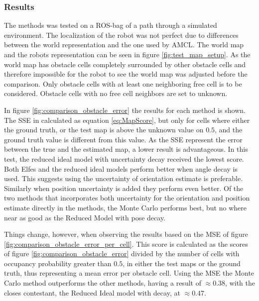 \subsubsection{Results}
The methods was tested on a ROS-bag of a path through a simulated environment. 
The localization of the robot was not perfect due to differences between the world representation and the one used by AMCL.
The world map and the robots representation can be seen in figure \vref{fig:test_map_setup}.
As the world map has obstacle cells completely surrounded by other obstacle cells and therefore impossible for the robot to see the world map was adjusted before the comparison. Only obstacle cells with at least one neighboring free cell is to be considered. Obstacle cells with no free cell neighbors are set to unknown. 

In figure \vref{fig:comparison_obstacle_error} the results for each method is shown. The SSE in calculated as equation \vref{eq:MapScore}, but only for cells where either the ground truth, or the test map is above the unknown value on $0.5$, and the ground truth value is different from this value. As the SSE represent the error between the true and the estimated map, a lower result is advantageous. In this test, the reduced ideal model with uncertainty decay received the lowest score. Both Elfes and the reduced ideal models perform better when angle decay is used. This suggests using the uncertainty of orientation estimate is preferable. Similarly when position uncertainty is added they perform even better. Of the two methods that incorporates both uncertainty for the orientation and position estimate directly in the methods, the Monte Carlo performs best, but no where near as good as the Reduced Model with pose decay. 
 
Things change, however, when observing the results based on the MSE of figure \vref{fig:comparison_obstacle_error_per_cell}. 
This score is calculated as the scores of figure \vref{fig:comparison_obstacle_error} divided by the number of cells with occupancy probability greater than \(0.5\), in either the test maps or the ground truth, thus representing a mean error per obstacle cell.
Using the MSE the Monte Carlo method outperforms the other methods, having a result of \(\approx 0.38\), with the closes contestant, the Reduced Ideal model with decay, at \(\approx 0.47\).\\


